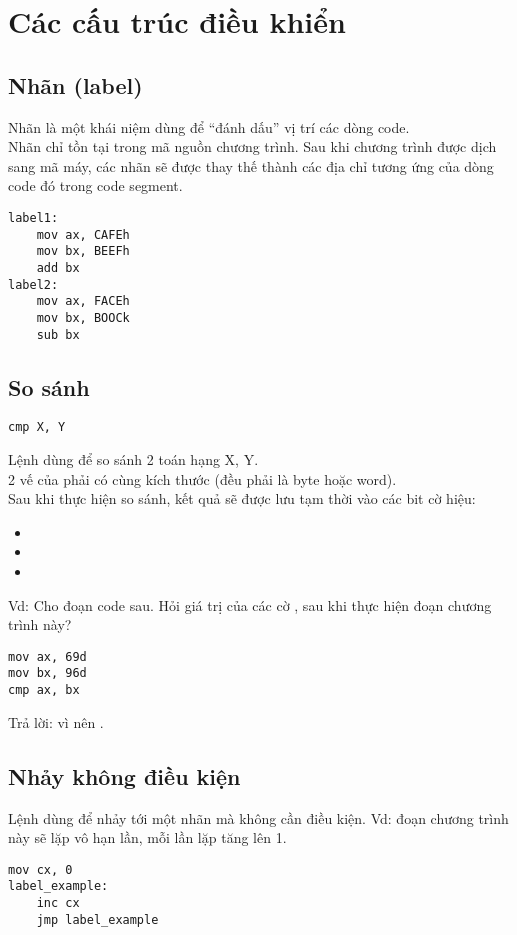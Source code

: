 \documentclass[main.tex]{subfiles}
\begin{document}
\section{Các cấu trúc điều khiển} \label{sec:cautrucdieukhien}
\subsection{Nhãn (label)} \label{subsec:label}
Nhãn là một khái niệm dùng để ``đánh dấu'' vị trí các dòng code. \\
Nhãn chỉ tồn tại trong mã nguồn chương trình. Sau khi chương trình được dịch sang mã máy, các nhãn sẽ được thay thế thành các địa chỉ tương ứng của dòng code đó trong code segment.
\begin{verbatim}
label1:
    mov ax, CAFEh 
    mov bx, BEEFh 
    add bx 
label2:
    mov ax, FACEh 
    mov bx, BOOCk
    sub bx 
\end{verbatim}

\subsection{So sánh } 
\begin{verbatim}
cmp X, Y
\end{verbatim}
Lệnh  dùng để so sánh 2 toán hạng \cd X, \cd Y.\\
2 vế của  phải có cùng kích thước (đều phải là byte hoặc word).\\
Sau khi thực hiện so sánh, kết quả sẽ được lưu tạm thời vào các bit cờ hiệu:
\begin{itemize}
    \item {}
    \item {}
    \item {}
\end{itemize}
Vd: Cho đoạn code sau. Hỏi giá trị của các cờ ,  sau khi thực hiện đoạn chương trình này?
\begin{verbatim}
mov ax, 69d
mov bx, 96d 
cmp ax, bx
\end{verbatim}
Trả lời: vì  nên .

\subsection{Nhảy không điều kiện } \label{subsec:jmp}
Lệnh  dùng để nhảy tới một nhãn mà không cần điều kiện.
Vd: đoạn chương trình này sẽ lặp vô hạn lần, mỗi lần lặp tăng  lên 1.
\begin{verbatim}
mov cx, 0
label_example:
    inc cx 
    jmp label_example
\end{verbatim}
\end{document}
